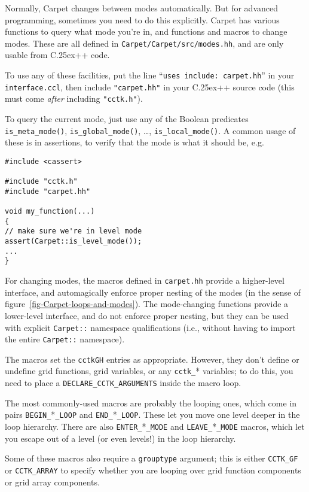 \documentclass{article}
\def\Cplusplus{\hbox{C\raise.25ex\hbox{\footnotesize ++}}}
\def\ie{i.e.\hbox{}}
\def\eg{e.g.\hbox{}}
\begin{document}
Normally, Carpet changes between modes automatically.  But for
advanced programming, sometimes you need to do this explicitly.
Carpet has various functions to query what mode you're in, and
functions and macros to change modes.  These are all defined in
\verb|Carpet/Carpet/src/modes.hh|, and are only usable from
\Cplusplus{} code.

To use any of these facilities, put the line
``\verb|uses include: carpet.hh|'' in your \verb|interface.ccl|,
then include \verb|"carpet.hh"| in your \Cplusplus{} source code
(this must come \emph{after} including \verb|"cctk.h"|).

To query the current mode, just use any of the Boolean predicates
\verb|is_meta_mode()|, \verb|is_global_mode()|, \dots, \verb|is_local_mode()|.
A common usage of these is in assertions, to verify that the mode
is what it should be, \eg{}
\begin{verbatim}
#include <cassert>

#include "cctk.h"
#include "carpet.hh"

void my_function(...)
{
// make sure we're in level mode
assert(Carpet::is_level_mode());
...
}
\end{verbatim}

For changing modes, the macros defined in \verb|carpet.hh| provide
a higher-level interface, and automagically enforce proper nesting
of the modes (in the sense of figure~\ref{fig-Carpet-loops-and-modes}).
The mode-changing functions provide a lower-level interface, and
do not enforce proper nesting, but they can be used with explicit
\verb|Carpet::| namespace qualifications (\ie, without having to import
the entire \verb|Carpet::| namespace).

The macros set the \verb|cctkGH| entries as appropriate.  However, they
don't define or undefine grid functions, grid variables, or any \verb|cctk_|*
variables; to do this, you need to place a \verb|DECLARE_CCTK_ARGUMENTS|
inside the macro loop.

The most commonly-used macros are probably the looping ones, which
come in pairs \verb|BEGIN_|*\verb|_LOOP| and \verb|END_|*\verb|_LOOP|.
These let you move one level deeper in the loop hierarchy.
There are also \verb|ENTER_|*\verb|_MODE| and \verb|LEAVE_|*\verb|_MODE|
macros, which let you escape out of a level (or even levels!) in the
loop hierarchy.

Some of these macros also require a \verb|grouptype| argument; this
is either \verb|CCTK_GF| or \verb|CCTK_ARRAY| to specify whether you
are looping over grid function components or grid array components.
\end{document}
